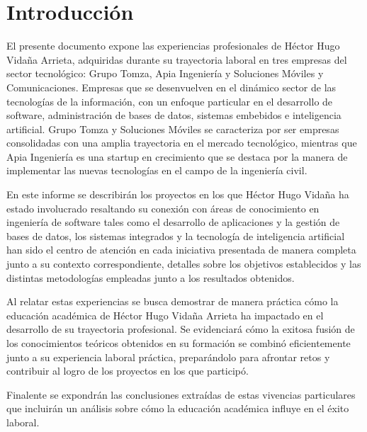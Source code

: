 \documentclass[final, fmstyle, 12pt]{article}
\begin{document}
\section{Introducción}
\setlength{\parskip}{1em} 
El presente documento expone las experiencias profesionales de Héctor Hugo Vidaña Arrieta, 
adquiridas durante su trayectoria laboral en tres empresas del sector tecnológico: 
Grupo Tomza, Apia Ingeniería y Soluciones Móviles y Comunicaciones. 
Empresas que se desenvuelven en el dinámico sector de las tecnologías de la información, 
con un enfoque particular en el desarrollo de software, administración de bases de datos,
sistemas embebidos e inteligencia artificial. Grupo Tomza y Soluciones Móviles se caracteriza por ser empresas consolidadas con una amplia trayectoria en el mercado tecnológico, mientras que Apia Ingeniería es una startup en crecimiento que se destaca por la manera de implementar las nuevas tecnologías en el campo de la ingeniería civil.

En este informe se describirán los proyectos en los que Héctor Hugo Vidaña ha estado involucrado resaltando su conexión con áreas de conocimiento en ingeniería de software tales como el desarrollo de aplicaciones y la gestión de bases de datos,
los sistemas integrados y la tecnología de inteligencia artificial han sido el centro de atención en cada iniciativa presentada de manera completa junto a su contexto correspondiente, detalles sobre los objetivos establecidos y las distintas metodologías empleadas junto a los resultados obtenidos.

Al relatar estas experiencias se busca demostrar de manera práctica cómo la educación académica de Héctor Hugo Vidaña Arrieta ha impactado en el desarrollo de su trayectoria profesional. Se evidenciará cómo la exitosa fusión de los conocimientos teóricos obtenidos en su formación se combinó eficientemente junto a su experiencia laboral práctica, preparándolo para afrontar retos y contribuir al logro de los proyectos en los que participó. 

Finalente se expondrán las conclusiones extraídas de estas vivencias particulares que incluirán un análisis sobre cómo la educación académica influye en el éxito laboral.
\end{document}
